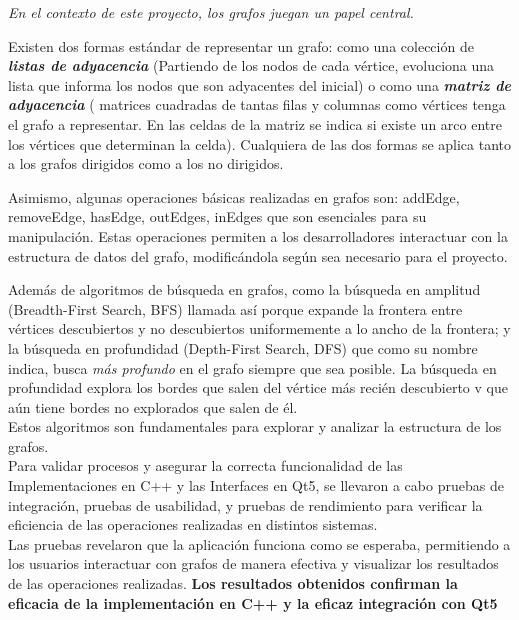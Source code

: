 \documentclass[conference]{IEEEtran}
\begin{document}
\begin{center}
    \textit{En el contexto de este proyecto, los grafos juegan un papel central.}\\%
\end{center}

Existen dos formas estándar de representar un grafo: como una colección de \textit{\textbf{listas de adyacencia}} (Partiendo de los nodos de cada vértice, evoluciona una lista que informa los nodos que son adyacentes del inicial) o como una \textit{\textbf{matriz de adyacencia}} ( matrices cuadradas de tantas filas y columnas como vértices tenga el grafo a representar. En las celdas de la matriz se indica si existe un arco entre los vértices que determinan la celda). Cualquiera de las dos formas se aplica tanto a los grafos dirigidos como a los no dirigidos. \cite{Adyacencias}

Asimismo, algunas operaciones básicas realizadas en grafos son: addEdge, removeEdge, hasEdge, outEdges, inEdges que son esenciales para su manipulación. Estas operaciones permiten a los desarrolladores interactuar con la estructura de datos del grafo, modificándola según sea necesario para el proyecto.\cite{FuncionesGraphs}

Además de algoritmos de búsqueda en grafos, como la búsqueda en amplitud (Breadth-First Search, BFS) llamada así porque expande la frontera entre vértices descubiertos y no descubiertos uniformemente a lo ancho de la frontera; y la búsqueda en profundidad (Depth-First Search, DFS) que como su nombre indica, busca \textit{más profundo} en el grafo siempre que sea posible. La búsqueda en profundidad explora los bordes que salen del vértice más recién descubierto v que aún tiene bordes no explorados que salen de él.\cite{BFS&DFS}\\
Estos algoritmos son fundamentales para explorar y analizar la estructura de los grafos.\\
Para validar procesos y asegurar la correcta funcionalidad de las Implementaciones en C++ y las Interfaces en Qt5, se llevaron a cabo pruebas de integración, pruebas de usabilidad, y pruebas de rendimiento para verificar la eficiencia de las operaciones realizadas en distintos sistemas.\\
Las pruebas revelaron que la aplicación funciona como se esperaba, permitiendo a los usuarios interactuar con grafos de manera efectiva y visualizar los resultados de las operaciones realizadas. \textbf{Los resultados obtenidos confirman la eficacia de la implementación en C++ y la eficaz integración con Qt5}
\end{document}
